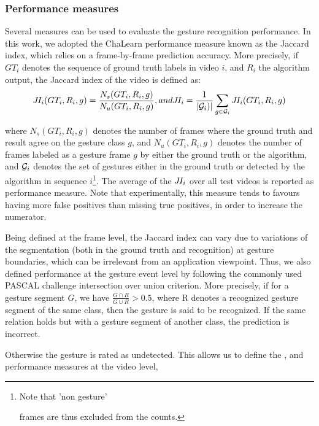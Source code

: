 \subsubsection{Performance measures}

Several measures can be used to evaluate the gesture recognition performance.
%
In this work, we adopted the ChaLearn performance measure known as the Jaccard index, which relies on a frame-by-frame prediction accuracy.
More precisely, if $GT_i$ denotes the sequence of ground truth labels in video $i$, and $R_i$ the algorithm output, the Jaccard index
of the video is defined as:
\begin{equation}
\jaccardindex_i(GT_i, R_i,g) = \frac{N_s(GT_i, R_i,g)}{N_u(GT_i, R_i,g)},
\mbox{ and } \jaccardindex_i = \frac{1}{|{\cal G}_i)|} \sum_{g \in {\cal G}_i} \jaccardindex_i(GT_i, R_i,g)
\end{equation}

where $N_s(GT_i, R_i, g)$ denotes the number of frames where the ground truth and result agree on the gesture class $g$,
and $N_u(GT_i, R_i, g)$ denotes the number of frames labeled as a gesture frame $g$ by  either the ground truth or the algorithm,
and ${{\cal G}_i}$ denotes the set of gestures either in the ground truth or detected by the algorithm in sequence $i$\footnote{Note that 'non gesture'

frames are thus excluded from the counts.}. The average of the $J\hspace*{-0.1em}I_i$ over all test videos is reported as performance measure.
%
Note that experimentally, this measure tends to favours having more false positives than missing true positives, in order to increase the numerator.

Being defined at the frame level, the Jaccard index can vary due to variations of the segmentation (both in the ground truth and recognition)
at gesture boundaries, which can be irrelevant from an application viewpoint.
%
Thus, we also defined performance at the gesture event level by following the commonly used PASCAL challenge intersection over union criterion.
More precisely, if for a gesture segment $G$, we have $\frac{G \cap R}{G \cup R} >  0.5$, where R denotes a recognized gesture
segment of the same class, then the  gesture is said to be recognized.
%
If the same relation holds but with a gesture segment of another class, the prediction is incorrect.

Otherwise the gesture is rated as undetected. This allows us to define the \eventaccuracy, \eventconfused and \eventmissed performance measures at the video level,

